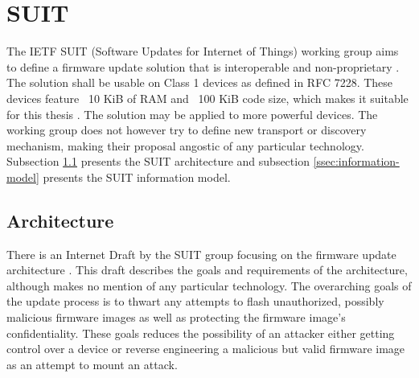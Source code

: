 \documentclass[0-thesis.tex]{subfiles}
\begin{document}
\section{SUIT}
\label{sec:suit}
The IETF SUIT (Software Updates for Internet of Things) working group aims to define a
firmware update solution that is interoperable and non-proprietary \parencite{suit}. The
solution shall be usable on Class 1 devices as defined in RFC 7228. These devices feature
~10 KiB of RAM and ~100 KiB code size, which makes it suitable for this thesis
\parencite{rfc7228}. The solution may be applied to more powerful devices. The working
group does not however try to define new transport or discovery mechanism, making their
proposal angostic of any particular technology. Subsection \ref{ssec:architecture}
presents the SUIT architecture and subsection \ref{ssec:information-model} presents the
SUIT information model.

\subsection{Architecture}
\label{ssec:architecture}
There is an Internet Draft by the SUIT group focusing on the firmware update architecture
\parencite{suit-architecture}. This draft describes the goals and requirements of the
architecture, although makes no mention of any particular technology. The overarching
goals of the update process is to thwart any attempts to flash unauthorized, possibly
malicious firmware images as well as protecting the firmware image's confidentiality.
These goals reduces the possibility of an attacker either getting control over a device or
reverse engineering a malicious but valid firmware image as an attempt to mount an attack.
\end{document}
